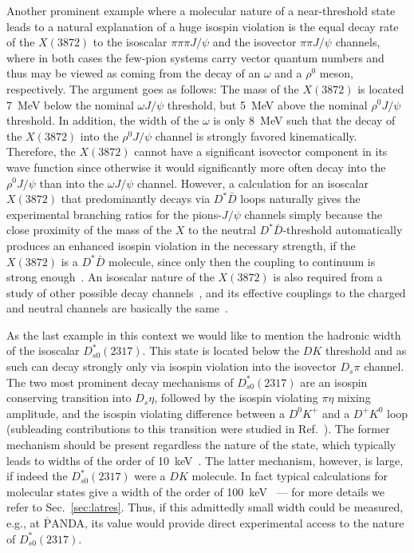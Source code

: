 Another prominent example where a molecular nature of a near-threshold state
leads to a natural explanation of a huge isospin violation is the equal decay
rate of the $X(3872)$ to the isoscalar $\pi\pi\pi J/\psi$ and the isovector
$\pi\pi J/\psi$ channels, where in both cases the few-pion systems carry vector
quantum numbers and thus may be viewed as coming from the decay of an $\omega$
and a $\rho^0$ meson, respectively. The argument goes as follows:
The mass of the $X(3872)$ is located 7~MeV below the nominal $\omega J/\psi$
threshold, but 5~MeV above the nominal $\rho^0 J/\psi$ threshold. In addition,
the width of the $\omega$ is only 8~MeV such that the decay of the $X(3872)$
into the $\rho^0 J/\psi$ channel is strongly favored kinematically. Therefore,
the $X(3872)$ cannot have a significant isovector component in its wave function
since otherwise it would significantly more often decay into the $\rho^0 J/\psi$
than into the $\omega J/\psi$ channel.
However, a calculation for an isoscalar $X(3872)$ that predominantly decays via
$D^*\bar D$ loops naturally gives the experimental branching ratios for the
pions-$J/\psi$ channels simply because the close proximity of the mass of the
$X$ to the neutral $D^*\bar D$-threshold automatically produces an enhanced
isospin violation in the necessary strength, if the $X(3872)$ is a $D^*\bar D$
molecule, since only then the coupling to continuum is strong
enough~\cite{Gamermann:2009fv}.
An isoscalar nature of the $X(3872)$ is also required from a study of other
possible decay channels~\cite{Mehen:2015efa}, and its effective couplings to the
charged and neutral channels are basically the
same~\cite{HidalgoDuque:2012pq,Guo:2014hqa}.

As the last example in this context we would like to mention the hadronic width
of the isoscalar  $D_{s0}^*(2317)$.
This state is located below the $DK$ threshold and as such can decay strongly
only via isospin violation  into the isovector $D_s\pi $ channel.
The two most prominent decay mechanisms of $D_{s0}^*(2317)$ are an isospin
conserving transition into $D_s\eta $, followed by the isospin violating $\pi
\eta$ mixing amplitude, and the isospin violating difference between a $D^0K^+$
and a $D^+K^0$ loop (subleading contributions to this transition were studied in
Ref.~\cite{Guo:2008gp}).
The former mechanism should be present regardless the nature of the state, which
typically leads to widths of the order of 10~keV~\cite{Colangelo:2003vg}.
The latter mechanism, however, is large, if indeed the $D_{s0}^*(2317)$ were a
$DK$ molecule.
In fact typical calculations for molecular states give a width of the order of
100~keV~\cite{Faessler:2007gv,Lutz:2007sk,Liu:2012zya} --- for more details we
refer to Sec.~\ref{sec:latres}.
Thus, if this admittedly small width could be measured, e.g., at
$\overline{\text{P}}$ANDA, its value would provide direct experimental access to
the nature of $D_{s0}^*(2317)$.


